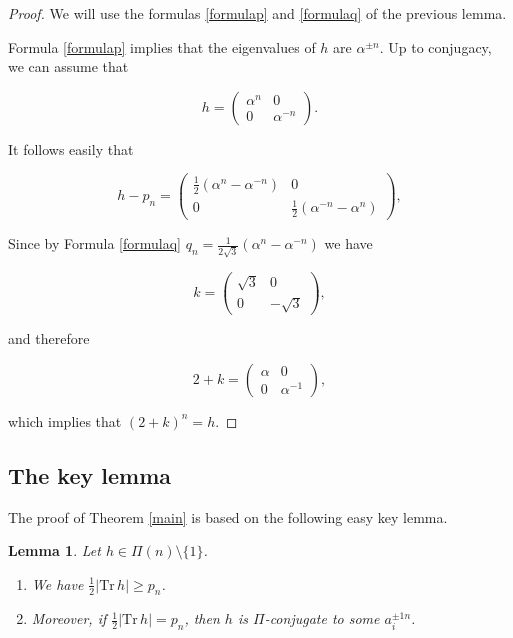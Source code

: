 \documentclass[10pt,a4paper]{amsart}
\newcommand{\Tr}{{\mathrm {Tr}}}
\newtheorem{lemma}{Lemma}
\begin{document}
\begin{proof}  We will use the formulas 
\ref{formulap}  and \ref{formulaq}  of the previous lemma. 

Formula \ref{formulap} implies that  the eigenvalues of $h$ are $\alpha^{\pm n}$.
Up to conjugacy, we can assume that


$$h=\begin{pmatrix}
\alpha^n & 0\\
0 &\alpha^{-n}
\end{pmatrix}.$$



It follows easily that 

$$h-p_n=\begin{pmatrix}
\frac{1}{2}(\alpha^n-\alpha^{-n}) & 0\\
0 &\frac{1}{2}(\alpha^{-n}-\alpha^n)
\end{pmatrix},$$

Since by Formula \ref{formulaq}
$q_n= \frac{1}{2\sqrt{3}}(\alpha^{n}-\alpha^{-n})$
we have


$$k=\begin{pmatrix}
\sqrt{3} & 0\\
0 &-\sqrt{3}
\end{pmatrix},$$

\noindent and therefore

$$2+k=\begin{pmatrix}
\alpha& 0\\
0 &\alpha^{-1}
\end{pmatrix},$$

\noindent which implies that $(2+k)^n=h$. 
\end{proof}

\subsection{The key lemma}

The proof of Theorem \ref{main} is based on the following
easy key lemma.

\begin{lemma}\label{key} Let $h\in\Pi(n)\setminus\{1\}$.

\begin{enumerate} 
\item[(a)] We have $\frac{1}{2}\vert \Tr\,h\vert \geq p_n$.
\item[(b)]  Moreover, if $\frac{1}{2}\vert \Tr\,h\vert = p_n$,
then  $h$ is $\Pi$-conjugate 
to some $a_i^{\pm1 n}$.
\end{enumerate}
\end{lemma}
\end{document}

